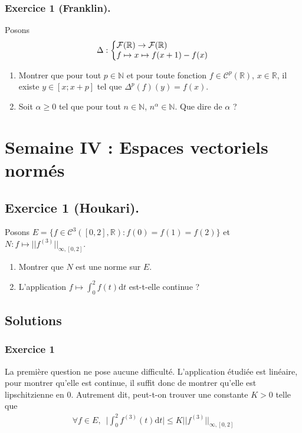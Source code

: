 \documentclass{article}
\begin{document}
\subsubsection*{Exercice 1 (Franklin).}
Posons
\begin{align*}
	\Delta : \left\{
		\begin{array}{@{}l@{\thinspace}l}
			\mathcal{F}(\mathbb{R}) \to \mathcal{F}(\mathbb{R})\\
			f \mapsto x \mapsto f(x+1)-f(x)
		\end{array}
		\right.
	\end{align*}
	\begin{enumerate}
		\item Montrer que pour tout $p\in \mathbb{N}$ et pour toute fonction $f \in \mathcal{C}^p(\mathbb{R})$, $x\in\mathbb{R}$, il existe $y \in [x;x+p]$  tel que $\Delta^p(f)(y) = f(x)$.
		\item Soit $\alpha \geq 0$ tel que pour tout $n\in\mathbb{N}$, $n^{\alpha} \in\mathbb{N}$. Que dire de $\alpha$ ?
	\end{enumerate}
\section{Semaine IV : Espaces vectoriels normés}
\subsection*{Exercice 1 (Houkari).}
Posons $E = \{f \in \mathcal{C}^{3}([0, 2], \mathbb{R}) : f(0) = f(1) = f(2)\}$ et $N : f \mapsto ||f^{(3)}||_{\infty, [0,2]}$. \begin{enumerate}
	\item Montrer que $N$ est une norme sur $E$.
	\item L'application $\displaystyle f\mapsto \int_{0}^2 f(t)\mathrm{d}t$ est-t-elle continue ?
\end{enumerate}
\subsection*{Solutions}
\subsubsection*{Exercice 1}
La première question ne pose aucune difficulté. L'application étudiée est linéaire, pour montrer qu'elle est continue, il suffit donc de montrer qu'elle est lipschitzienne en $0$. Autrement dit, peut-t-on trouver une constante $K>0$ telle que 
\begin{align*}
	\forall f \in E, \,\,\, \bigg|\int_{0}^2 f^{(3)}(t)\mathrm{d}t\bigg|\leq K ||f^{(3)}||_{\infty, [0,2]}
\end{align*}
\end{document}
